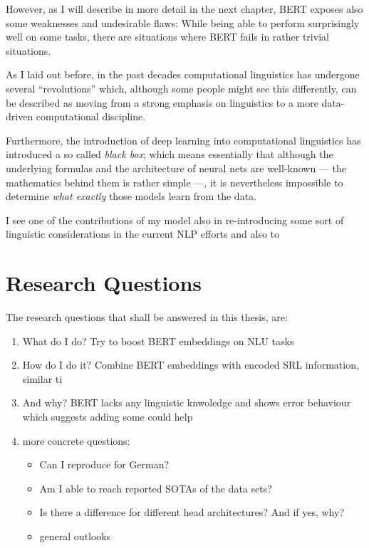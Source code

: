 However, as I will describe in more detail in the next chapter, BERT exposes also
some weaknesses and undesirable flaws: While being able to perform surprisingly well
on some tasks, there are situations where BERT fails in rather trivial situations.

{\color{red} As I laid out before, in the past decades computational linguistics has undergone several
``revolutions'' which, although some people might see this differently, can be described as
moving from a strong emphasis on linguistics to a more data-driven computational discipline.

Furthermore, the introduction of deep learning into computational linguistics has introduced a
so called \emph{black box}; which means essentially that although the underlying formulas and the
architecture of neural nets are well-known --- the mathematics behind them is rather simple ---,
it is nevertheless impossible to determine \emph{what exactly} those models learn from the data.

I see one of the contributions of my model also in re-introducing some sort of linguistic
considerations in the current NLP efforts and also to}


\section{Research Questions}

The research questions that shall be answered in this thesis, are:
\begin{enumerate}
 \item What do I do? Try to boost BERT embeddings on NLU tasks
 \item How do I do it?  Combine BERT embeddings with encoded SRL information, similar ti \cite{zhang2019paws}
 \item And why? BERT lacks any linguistic knwoledge and shows error behaviour which suggests adding some could help
 \item more concrete questions:
 \begin{itemize}
    \item Can I reproduce \cite{zhang2019semantics} for German?
    \item Am I able to reach reported SOTAs of the data sets?
    \item Is there a difference for different head architectures? And if yes, why?
    \item general outlooks
 \end{itemize}
\end{enumerate}

